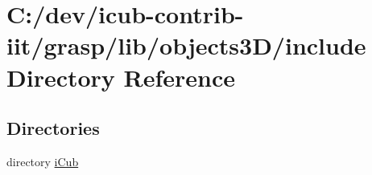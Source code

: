 \section{C\+:/dev/icub-\/contrib-\/iit/grasp/lib/objects3\+D/include Directory Reference}
\label{dir_f4becebc399c8277de02e920ccd40b39}
\subsection*{Directories}
\begin{DoxyCompactItemize}
\item 
directory \hyperlink{dir_d1c8e331d6df591f0fd1c7d162279611}{i\+Cub}
\end{DoxyCompactItemize}
